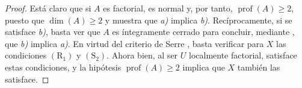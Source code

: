 \begin{proof}
Está claro que si $A$ es factorial, es normal y, por tanto, $\operatorname{prof}(A)\geq2$, puesto que $\dim(A)\geq2$  y  muestra que \emph{a)} implica \emph{b)}.
Recíprocamente, si se satisface \emph{b)}, basta ver que $A$ es íntegramente cerrado para concluir, mediante , que \emph{b)} implica \emph{a)}.
En virtud del criterio de Serre , basta verificar para $X$ las condiciones $(\mathrm{R}_1)$ y $(\mathrm{S}_2)$.
Ahora bien, al ser $U$ localmente factorial, satisface estas condiciones, y la hipótesis $\operatorname{prof}(A)\geq2$ implica que $X$ también las satisface.
\end{proof}
